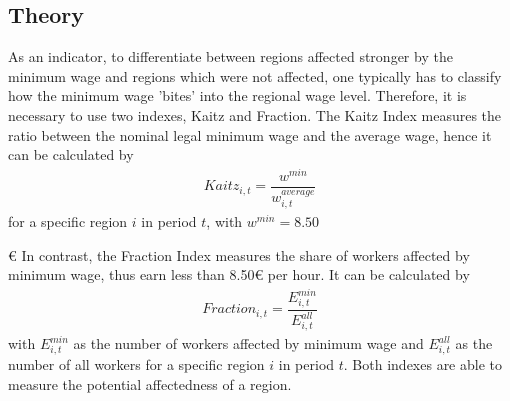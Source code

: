 \documentclass[a4paper]{article}
\begin{document}
\subsection{Theory} 
As an indicator, to differentiate between regions affected stronger by the minimum wage and regions which were not affected, one typically has to classify how the minimum wage 'bites' into the regional wage level. Therefore, it is necessary to use two indexes, Kaitz and Fraction. \newline
The Kaitz Index measures the ratio between the nominal legal minimum wage and the average wage, hence it can be calculated by 
\begin{align}
Kaitz_{i,t} = \dfrac{w^{min}}{w_{i,t}^{average}}
\end{align}
for a specific region $i$ in period $t$, with $w^{min} = 8.50${\euro\newline
In contrast, the Fraction Index measures the share of workers affected by minimum wage, thus earn less than 8.50{\euro} per hour. It can be calculated by
\begin{align}
Fraction_{i,t} = \dfrac{E_{i,t}^{min}}{E_{i,t}^{all}}
\end{align}
with $E_{i,t}^{min}$ as the number of workers affected by minimum wage and $E_{i,t}^{all}$ as the number of all workers for a specific region $i$ in period $t$. Both indexes are able to measure the potential affectedness of a region.

}
\end{document}

